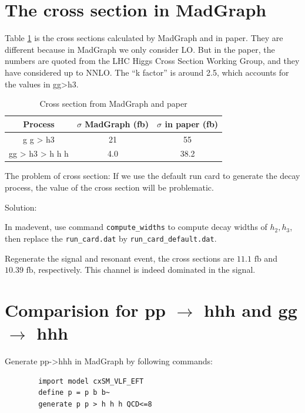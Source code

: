 \documentclass[12pt]{article}
\begin{document}
	
\section{The cross section in MadGraph}%
\label{sec:the_cross_section_in_madgraph}
Table \ref{tab:Cross_section_from_MadGraph_and_paper} is the cross sections calculated by MadGraph and in paper. They are different because in MadGraph we only consider LO. But in the paper, the numbers are quoted from the LHC Higgs Cross Section Working Group, and they have considered up to NNLO. The ``k factor'' is around 2.5, which accounts for the values in gg>h3.
	\begin{table}[htpb]
		\centering
		\caption{Cross section from MadGraph and paper}
		\label{tab:Cross_section_from_MadGraph_and_paper}
		\begin{tabular}{ccc}
			Process & $\sigma$  MadGraph (fb)  & $\sigma$ in paper (fb)\\
			\hline
			g g > h3 & 21 & 55 \\
			gg > h3 > h h h & 4.0 &  38.2 \\
			\hline
		\end{tabular}	
	\end{table}

	The problem of cross section: If we use the default run card to generate the decay process, the value of the cross section will be problematic. 

	Solution:
	
	In madevent, use command \verb+compute_widths+ to compute decay widths of $h_2,h_3$, then replace the \verb+run_card.dat+ by \verb+run_card_default.dat+.

	Regenerate the signal and resonant event, the cross sections are $\text{11.1 fb}$ and $\text{10.39 fb}$, respectively. This channel is indeed dominated in the signal.
\section{Comparision for \texorpdfstring{pp $\to $ hhh}{pp to hhh} and gg \texorpdfstring{$\to $}{to} hhh}%
\label{sec:comparision_for_pp_to_hhh_and_gg_to_hhh}
	Generate pp->hhh in MadGraph by following commands:
	\begin{verbatim}
		import model cxSM_VLF_EFT
		define p = p b b~
		generate p p > h h h QCD<=8	
	\end{verbatim}
\end{document}
